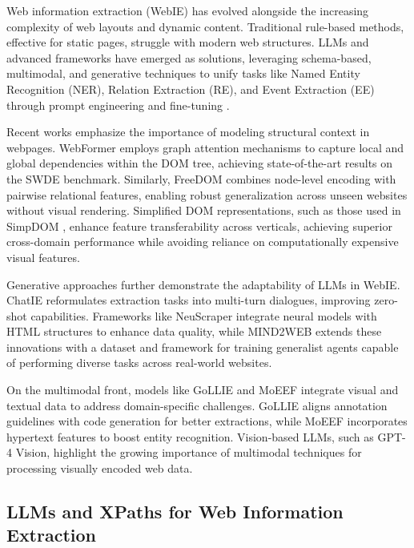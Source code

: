 \documentclass[a4paper]{article}
\begin{document}
Web information extraction (WebIE) has evolved alongside the increasing complexity of web layouts and dynamic content. Traditional rule-based methods, effective for static pages, struggle with modern web structures. LLMs and advanced frameworks have emerged as solutions, leveraging schema-based, multimodal, and generative techniques to unify tasks like Named Entity Recognition (NER), Relation Extraction (RE), and Event Extraction (EE) through prompt engineering and fine-tuning \cite{xu2024largelanguagemodelsgenerative}.

Recent works emphasize the importance of modeling structural context in webpages. WebFormer \cite{wang2022webformerwebpagetransformerstructure} employs graph attention mechanisms to capture local and global dependencies within the DOM tree, achieving state-of-the-art results on the SWDE benchmark. Similarly, FreeDOM \cite{DBLP:journals/corr/abs-2010-10755} combines node-level encoding with pairwise relational features, enabling robust generalization across unseen websites without visual rendering. Simplified DOM representations, such as those used in SimpDOM \cite{zhou2021simplifieddomtreestransferable}, enhance feature transferability across verticals, achieving superior cross-domain performance while avoiding reliance on computationally expensive visual features.

Generative approaches further demonstrate the adaptability of LLMs in WebIE. ChatIE \cite{wei2024chatie} reformulates extraction tasks into multi-turn dialogues, improving zero-shot capabilities. Frameworks like NeuScraper \cite{ahluwalia2024leveraginglargelanguagemodels} integrate neural models with HTML structures to enhance data quality, while MIND2WEB \cite{deng2023mind2webgeneralistagentweb} extends these innovations with a dataset and framework for training generalist agents capable of performing diverse tasks across real-world websites.

On the multimodal front, models like GoLLIE \cite{sainz2024gollieannotationguidelinesimprove} and MoEEF \cite{yang2024hypertextentityextractionwebpage} integrate visual and textual data to address domain-specific challenges. GoLLIE aligns annotation guidelines with code generation for better extractions, while MoEEF incorporates hypertext features to boost entity recognition. Vision-based LLMs, such as GPT-4 Vision\cite{fellman-etal-2024-future}, highlight the growing importance of multimodal techniques for processing visually encoded web data.

\subsection{LLMs and XPaths for Web Information Extraction}
\end{document}
